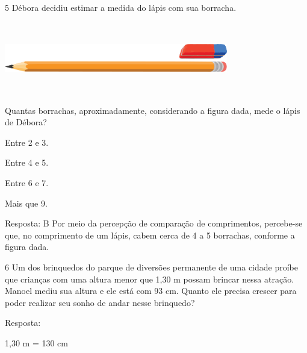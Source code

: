 \begin{escolha}
\begin{escolha}

\end{escolha}


\num{5} Débora decidiu estimar a medida do lápis com sua borracha.

\includegraphics[width=3.84200in,height=1.23344in]{media/image46.png}


Quantas borrachas, aproximadamente, considerando a figura dada, mede o lápis de Débora?

\begin{escolha}
\item
  Entre 2 e 3.
\item
  Entre 4 e 5.
\item
  Entre 6 e 7.
\item
  Mais que 9.
\end{escolha}

Resposta: B
Por meio da percepção de comparação de comprimentos, percebe-se que, no
comprimento de um lápis, cabem cerca de 4 a 5 borrachas, conforme a figura dada.

\num{6} Um dos brinquedos do parque de diversões permanente de uma cidade proíbe
que crianças com uma altura menor que 1,30 m possam brincar nessa
atração. Manoel mediu sua altura e ele está com 93 cm. Quanto ele
precisa crescer para poder realizar seu sonho de andar nesse brinquedo?


Resposta:

1,30 m = 130 cm


\end{escolha}
